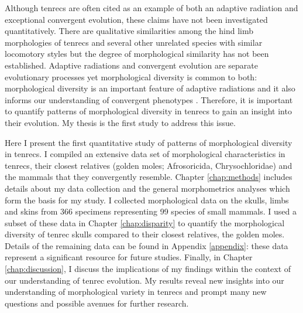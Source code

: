	Although tenrecs are often cited as an example of both an adaptive radiation and exceptional convergent evolution, these claims have not been investigated quantitatively. There are qualitative similarities among the hind limb morphologies of tenrecs and several other unrelated species with similar locomotory styles \citep{Salton2009} but the degree of morphological similarity has not been established. Adaptive radiations and convergent evolution are separate evolutionary processes yet morphological diversity is common to both: morphological diversity is an important \citep[though not defining,][]{Olson2009} feature of adaptive radiations \citep{Losos2010a} and it also informs our understanding of convergent phenotypes \citep{Muschick2012}. Therefore, it is important to quantify patterns of morphological diversity in tenrecs to gain an insight into their evolution. My thesis is the first study to address this issue. 



	Here I present the first quantitative study of patterns of morphological diversity in tenrecs. I compiled an extensive data set of morphological characteristics in tenrecs, their closest relatives (golden moles; Afrosoricida, Chrysochloridae) and the mammals that they convergently resemble. Chapter \ref{chap:methods} includes details about my data collection and the general morphometrics analyses which form the basis for my study. I collected morphological data on the skulls, limbs and skins from 366 specimens representing 99 species of small mammals. I used a subset of these data in Chapter \ref{chap:disparity} to quantify the morphological diversity of tenrec skulls compared to their closest relatives, the golden moles. Details of the remaining data can be found in Appendix \ref{appendix}: these data represent a significant resource for future studies. Finally, in Chapter \ref{chap:discussion}, I discuss the implications of my findings within the context of our understanding of tenrec evolution. My results reveal new insights into our understanding of morphological variety in tenrecs and prompt many new questions and possible avenues for further research.


